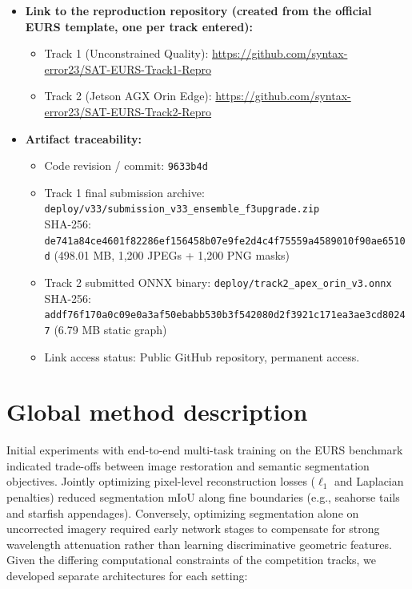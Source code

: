 \documentclass{article}
\begin{document}
\begin{itemize}[leftmargin=*]
\begin{itemize}
  \end{itemize}
\item \textbf{Link to the reproduction repository (created from the official EURS template, one per track entered):}
  \begin{itemize}
    \item Track 1 (Unconstrained Quality): \url{https://github.com/syntax-error23/SAT-EURS-Track1-Repro}
    \item Track 2 (Jetson AGX Orin Edge): \url{https://github.com/syntax-error23/SAT-EURS-Track2-Repro}
  \end{itemize}
\item \textbf{Artifact traceability:}
  \begin{itemize}
    \item Code revision / commit: \texttt{9633b4d}
    \item Track 1 final submission archive: \texttt{deploy/v33/submission\_v33\_ensemble\_f3upgrade.zip} \\
    SHA-256: \texttt{de741a84ce4601f82286ef156458b07e9fe2d4c4f75559a4589010f90ae6510d} (498.01 MB, 1,200 JPEGs + 1,200 PNG masks)
    \item Track 2 submitted ONNX binary: \texttt{deploy/track2\_apex\_orin\_v3.onnx} \\
    SHA-256: \texttt{addf76f170a0c09e0a3af50ebabb530b3f542080d2f3921c171ea3ae3cd80247} (6.79 MB static graph)
    \item Link access status: Public GitHub repository, permanent access.
  \end{itemize}
\end{itemize}

\section{Global method description}\label{sec:global}

Initial experiments with end-to-end multi-task training on the EURS benchmark indicated trade-offs between image restoration and semantic segmentation objectives. Jointly optimizing pixel-level reconstruction losses ($\ell_1$ and Laplacian penalties) reduced segmentation mIoU along fine boundaries (e.g., seahorse tails and starfish appendages). Conversely, optimizing segmentation alone on uncorrected imagery required early network stages to compensate for strong wavelength attenuation rather than learning discriminative geometric features. Given the differing computational constraints of the competition tracks, we developed separate architectures for each setting:
\end{document}
